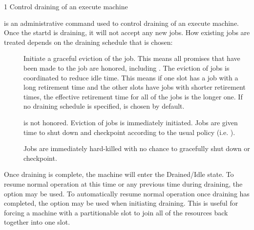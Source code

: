 \begin{ManPage}
{\label{man-condor-drain}}{1}
{Control draining of an execute machine}
\Synopsis {}

\ToolDebugOption
{}

\ToolDebugOption
{}


\Description

 is an administrative command used to control draining
of an execute machine.  Once the startd is draining, it will not
accept any new jobs.  How existing jobs are treated depends on the
draining schedule that is chosen:

\begin{description}

\item[] Initiate a graceful eviction of the job.  This means
all promises that have been made to the job are honored, including
.  The eviction of jobs is coordinated
to reduce idle time.  This means if one slot has a job with a long
retirement time and the other slots have jobs with shorter retirement
times, the effective retirement time for all of the jobs is the longer
one.  If no draining schedule is specified,  is chosen
by default.

\item[]  is not honored.  Eviction
of jobs is immediately initiated.  Jobs are given time to shut down
and checkpoint according to the usual policy
(i.e. ).

\item[] Jobs are immediately hard-killed with no chance to
gracefully shut down or checkpoint.

\end{description}

Once draining is complete, the machine will enter the Drained/Idle
state.  To resume normal operation at this time or any previous time
during draining, the  option may be used.  To
automatically resume normal operation once draining has completed, the
 option may be used when initiating
draining.  This is useful for forcing a machine with a partitionable
slot to join all of the resources back together into one slot.


\end{ManPage}
